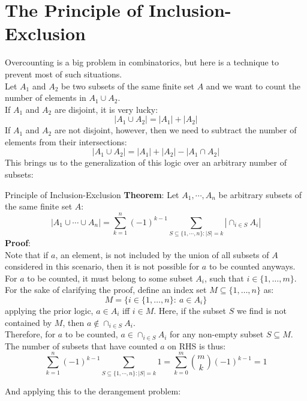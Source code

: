 \section{The Principle of Inclusion-Exclusion}
Overcounting is a big problem in combinatorics, but here is a technique to prevent most of such situations. \\
Let $A_1$ and $A_2$ be two subsets of the same finite set $A$ and we want to count the number of elements in $A_1 \cup A_2$. \\
If $A_1$ and $A_2$ are disjoint, it is very lucky:
\[|A_1 \cup A_2| = |A_1| + |A_2|\]
If $A_1$ and $A_2$ are not disjoint, however, then we need to subtract the number of elements from their intersections:
\[|A_1 \cup A_2| = |A_1| + |A_2| - |A_1 \cap A_2|\]
This brings us to the generalization of this logic over an arbitrary number of subsets:
\begin{ln-theorem}{Principle of Inclusion-Exclusion}{}
    \textbf{Theorem}: Let $A_1, \cdots, A_n$ be arbitrary subsets of the same finite set $A$:
    \[|A_1 \cup \cdots \cup A_n| = \sum_{k = 1}^n {(-1)}^{k - 1} \sum_{S \subseteq \{1, \cdots, n\}:|S| = k} |\cap_{i \in S}A_i|\]
    \tcblower
    \textbf{Proof}: \\
    Note that if $a$, an element, is not included by the union of all subsets of $A$ considered in this scenario, then it is not possible for $a$ to be counted anyways. \\
    For $a$ to be counted, it must belong to some subset $A_i$, such that $i \in \{1, \dots, m\}$. \\
    For the sake of clarifying the proof, define an index set $M \subseteq \{1, \dots, n\}$ as:
    \[M = \{i \in \{1, \dots, n\}:\ a \in A_i\}\]
    applying the prior logic, $a \in A_i$ iff $i \in M$. Here, if the subset $S$ we find is not contained by $M$, then $a \notin \cap_{i \in S}A_i$. \\
    Therefore, for $a$ to be counted, $a \in \cap_{i \in S}A_i$ for any non-empty subset $S \subseteq M$. \\
    The number of subsets that have counted $a$ on RHS is thus:
    \[\sum_{k = 1}^n {(-1)}^{k - 1} \sum_{S \subseteq \{1, \cdots, n\}:|S| = k} 1 = \sum_{k = 0}^m \binom{m}{k} {(-1)}^{k - 1} = 1\]
\end{ln-theorem}
And applying this to the derangement problem:
